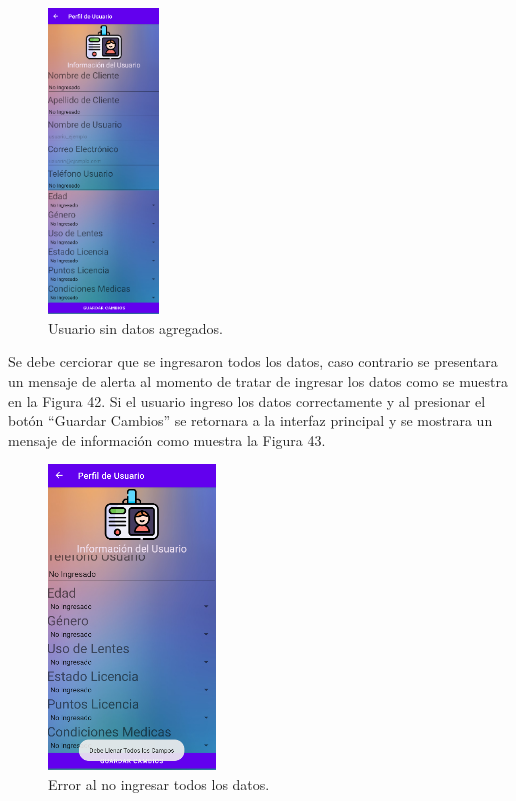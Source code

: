 \documentclass[a4paper,10pt, oneside, titlepage]{article}
\begin{document}
	\begin{figure}[!ht]
		\centering
		\includegraphics[width = 0.4\linewidth, height = 8.1cm]{41.png}
		\caption{Usuario sin datos agregados.}
	\end{figure}
	Se debe cerciorar que se ingresaron todos los datos, caso  contrario se presentara un mensaje de alerta al momento de tratar de ingresar los datos como se muestra en la Figura 42. Si el usuario ingreso los datos correctamente y al presionar el botón ``Guardar Cambios'' se retornara a la interfaz principal y se mostrara un mensaje de información como muestra la Figura 43.
	\begin{figure}[!ht]
		\centering
		\includegraphics[width = 0.4\linewidth, height = 8.1cm]{42.png}
		\caption{Error al no ingresar todos los datos.}
	\end{figure}
\end{document}
